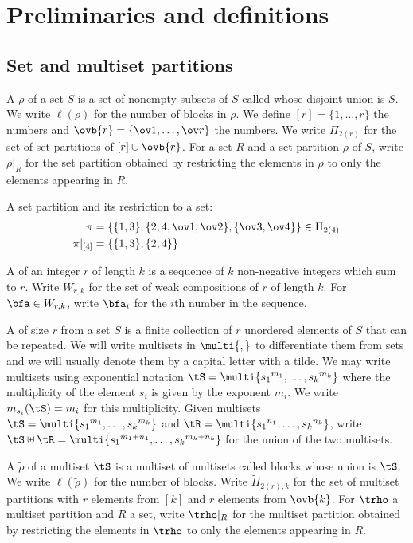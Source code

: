 \section{Preliminaries and definitions}\label{sec:prelim}

\subsection{Set and multiset partitions}

A  $\rho$ of a set $S$ is a set of nonempty subsets of $S$ called  whose disjoint union is $S$. We write $\ell(\rho)$ for the number of blocks in $\rho$. We define $[r]=\{1,\dots,r\}$ the  numbers and $\ovb{r}=\{\ov1,\dots,\ov r\}$ the  numbers. We write $\Pi_{2(r)}$ for the set of set partitions of $[r]\cup\ovb{r}$. For a set $R$ and a set partition $\rho$ of $S$, write $\rho|_R$ for the set partition obtained by restricting the elements in $\rho$ to only the elements appearing in $R$.

\begin{exam} A set partition and its restriction to a set:
    \begin{align*}
        \pi&=\{\{1,3\},\{2,4,\ov1,\ov2\},\{\ov3,\ov4\}\}\in\Pi_{2(4)}\\
        \pi|_{[4]}&=\{\{1,3\},\{2,4\}\}
    \end{align*}
\end{exam}

A  of an integer $r$ of length $k$ is a sequence of $k$ non-negative integers which sum to $r$. Write $W_{r,k}$ for the set of weak compositions of $r$ of length $k$. For $\bfa\in W_{r,k}$, write $\bfa_i$ for the $i$th number in the sequence.

A  of size $r$ from a set $S$ is a finite collection of $r$ unordered elements of $S$ that can be repeated. We will write multisets in $\multi{,}$ to differentiate them from sets and we will usually denote them by a capital letter with a tilde. We may write multisets using exponential notation $\tS=\multi{{s_1}^{m_1},\dots,{s_k}^{m_k}}$ where the multiplicity of the element $s_i$ is given by the exponent $m_i$. We write $m_{s_i}(\tS)=m_i$ for this multiplicity. Given multisets $\tS=\multi{{s_1}^{m_1},\dots,{s_k}^{m_k}}$ and $\tR=\multi{{s_1}^{n_1},\dots,{s_k}^{n_k}}$, write $\tS\uplus\tR=\multi{{s_1}^{m_1+n_1},\dots,{s_k}^{m_k+n_k}}$ for the union of the two multisets.

A  $\tilde\rho$ of a multiset $\tS$ is a multiset of multisets called blocks whose union is $\tS$. We write $\ell(\tilde\rho)$ for the number of blocks. Write $\tilde\Pi_{2(r),k}$ for the set of multiset partitions with $r$ elements from $[k]$ and $r$ elements from $\ovb{k}$. For $\trho$ a multiset partition and $R$ a set, write $\trho|_{R}$ for the multiset partition obtained by restricting the elements in $\trho$ to only the elements appearing in $R$. 

